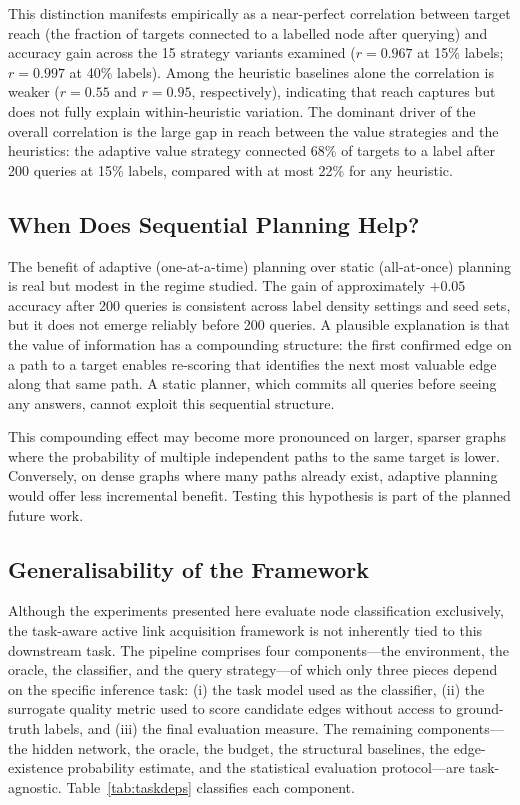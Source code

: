 \documentclass[11pt,a4paper]{article}
\begin{document}
This distinction manifests empirically as a near-perfect correlation between target reach (the
fraction of targets connected to a labelled node after querying) and accuracy gain across the
15 strategy variants examined ($r = 0.967$ at 15\% labels; $r = 0.997$ at 40\% labels). Among
the heuristic baselines alone the correlation is weaker ($r = 0.55$ and $r = 0.95$,
respectively), indicating that reach captures but does not fully explain within-heuristic
variation. The dominant driver of the overall correlation is the large gap in reach between
the value strategies and the heuristics: the adaptive value strategy connected 68\% of targets
to a label after 200 queries at 15\% labels, compared with at most 22\% for any heuristic.

\subsection{When Does Sequential Planning Help?}

The benefit of adaptive (one-at-a-time) planning over static (all-at-once) planning is
real but modest in the regime studied. The gain of approximately $+0.05$ accuracy after 200
queries is consistent across label density settings and seed sets, but it does not emerge
reliably before 200 queries. A plausible explanation is that the value of information has a
compounding structure: the first confirmed edge on a path to a target enables re-scoring that
identifies the next most valuable edge along that same path. A static planner, which commits
all queries before seeing any answers, cannot exploit this sequential structure.

This compounding effect may become more pronounced on larger, sparser graphs where the
probability of multiple independent paths to the same target is lower. Conversely, on dense
graphs where many paths already exist, adaptive planning would offer less incremental benefit.
Testing this hypothesis is part of the planned future work.

\subsection{Generalisability of the Framework}

Although the experiments presented here evaluate node classification exclusively, the
task-aware active link acquisition framework is not inherently tied to this downstream task.
The pipeline comprises four components---the environment, the oracle, the classifier, and the
query strategy---of which only three pieces depend on the specific inference task: (i) the
task model used as the classifier, (ii) the surrogate quality metric used to score candidate
edges without access to ground-truth labels, and (iii) the final evaluation measure. The
remaining components---the hidden network, the oracle, the budget, the structural baselines,
the edge-existence probability estimate, and the statistical evaluation protocol---are
task-agnostic. Table~\ref{tab:taskdeps} classifies each component.
\end{document}
